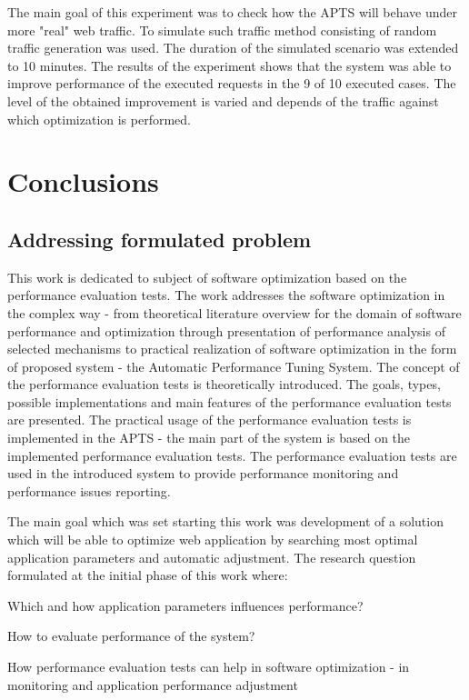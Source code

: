 \documentclass[12pt,a4paper]{article}
\let\tempone\itemize
\let\temptwo\enditemize
\renewenvironment{itemize}{\tempone\addtolength{\itemsep}{-0.4\baselineskip}}{\temptwo}
\begin{document}
The main goal of this experiment was to check how the APTS will behave under more "real" web traffic. To simulate such traffic method consisting of random traffic generation was used. The duration of the simulated scenario was extended to 10 minutes. The results of the experiment shows that the system was able to improve performance of the executed requests in the 9 of 10 executed cases. The level of the obtained improvement is varied and depends of the traffic against which optimization is performed.


\section{Conclusions} \label{section:conclusions}

\subsection{Addressing formulated problem}

This work is dedicated to subject of software optimization based on the performance evaluation tests. The work addresses the software optimization in the complex way - from theoretical literature overview for the domain of software performance and optimization through presentation of performance analysis of selected mechanisms to practical realization of software optimization in the form of proposed system - the Automatic Performance Tuning System. The concept of the performance evaluation tests is theoretically introduced. The goals, types, possible implementations and main features of the performance evaluation tests are presented. The practical usage of the performance evaluation tests is implemented in the APTS - the main part of the system is based on the implemented performance evaluation tests. The performance evaluation tests are used in the introduced system to provide performance monitoring and performance issues reporting.

The main goal which was set starting this work was development of a solution which will be able to optimize web application by searching most optimal application parameters and automatic adjustment.  The research question formulated at the initial phase of this work where:
\begin{itemize}
\item Which and how application parameters influences performance?
\item How to evaluate performance of the system?
\item How performance evaluation tests can help in software optimization - in monitoring and application performance adjustment
\end{itemize} 
\end{document}
